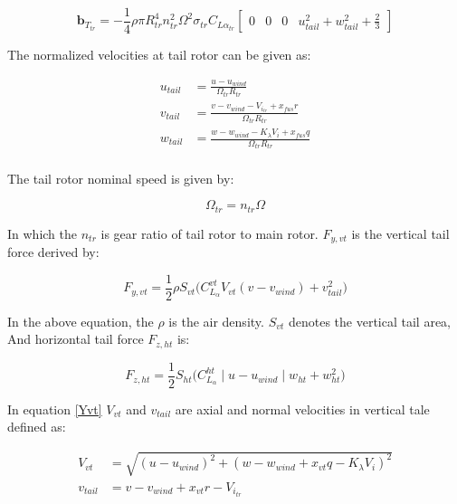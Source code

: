 \begin{equation}\label{b_Ttr}
	\textbf{b}_{T_{tr}}= -\frac{1}{4} \rho \pi R_{tr}^4 n_{tr}^2 \Omega^2 \sigma_{tr} C_{L\alpha_{tr}}\begin{bmatrix}
		0&
		0&
		0&
		u_{tail}^2+w_{tail}^2+\frac{2}{3}
	\end{bmatrix}
\end{equation}

The normalized velocities at tail rotor can be given as:

\begin{equation}
	\begin{aligned}
		u_{tail}&=\frac{u-u_{wind}}{\Omega_{tr} R_{tr} }\\
		v_{tail}&=\frac{v-v_{wind}-V_{i_{tr}}+x_{fus}r}{\Omega_{tr} R_{tr}} \\
		w_{tail}&= \frac{w-w_{wind}-K_{\lambda}V_i+x_{fus}q}{\Omega_{tr} R_{tr}}\\
	\end{aligned}
\end{equation}

The tail rotor nominal speed is given by:

\begin{equation}
			\Omega_{tr}=n_{tr}\Omega  
\end{equation}

In which the $n_{tr}$ is gear ratio of tail rotor to main rotor. $F_{y,vt}$ is the vertical tail force derived by:

\begin{equation}\label{Yvt}
	F_{y,vt}=\frac{1}{2} \rho S_{vt} \Big( C_{L_\alpha}^{vt}V_{vt}(v-v_{wind})+v_{tail}^2 \Big)
\end{equation}

In the above equation, the $\rho$ is the air density. $S_{vt}$ denotes the vertical tail area, 
And horizontal tail force $F_{z,ht}$ is:

\begin{equation} \label{Z_ht}
	F_{z,ht}=\frac{1}{2} S_{ht} \Big( C_{L_{\alpha}}^{ht} \mid u-u_{wind} \mid w_{ht} +w_{ht}^2 \Big)    
\end{equation}

In equation \ref{Yvt} $V_{vt}$ and $v_{tail}$ are axial and normal velocities in vertical tale defined as:

\begin{equation}
	\begin{aligned}
		V_{vt}&=\sqrt{(u-u_{wind})^2+(w- w_{wind} +x_{vt}q-K_\lambda V_i)^2}\\
		v_{tail}&=v-v_{wind}+x_{vt}r-V_{i_{tr}} \\
	\end{aligned}
\end{equation}

